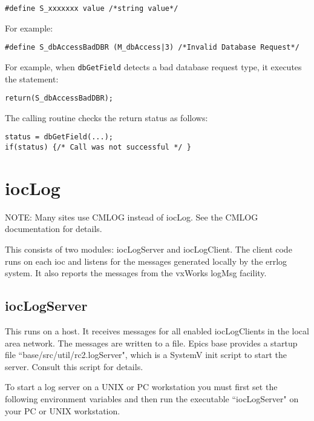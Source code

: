 \begin{verbatim}
#define S_xxxxxxx value /*string value*/
\end{verbatim}

For example:

\begin{verbatim}
#define S_dbAccessBadDBR (M_dbAccess|3) /*Invalid Database Request*/
\end{verbatim}

For example, when \verb|dbGetField| detects a bad database request type, it executes the statement:

\begin{verbatim}
return(S_dbAccessBadDBR);
\end{verbatim}

The calling routine checks the return status as follows:

\begin{verbatim}
status = dbGetField(...);
if(status) {/* Call was not successful */ }
\end{verbatim}

\section{iocLog}

NOTE: Many sites use CMLOG instead of iocLog. See the CMLOG documentation for details.

This consists of two modules: iocLogServer and iocLogClient. The client code runs on each ioc and listens for the 
messages generated locally by the errlog system. It also reports the messages from the vxWorks logMsg facility.

\subsection{iocLogServer}

This runs on a host. It receives messages for all enabled iocLogClients in the local area network. The messages are written 
to a file. Epics base provides a startup file ``base/src/util/rc2.logServer", which is a SystemV init script to start the server. 
Consult this script for details.

To start a log server on a UNIX or PC workstation you must first set the following environment variables and then run the 
executable ``iocLogServer" on your PC or UNIX workstation. 

